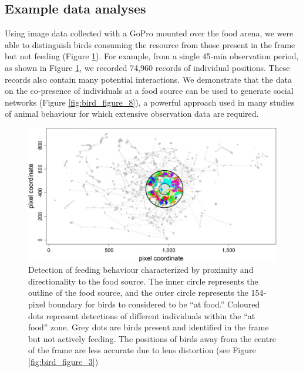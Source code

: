 \documentclass[11pt,a4paper,oneside]{book}
\begin{document}
\begin{doublespace}
\subsection{Example data analyses}
Using image data collected with a GoPro mounted over the food arena, we were able to distinguish birds consuming the resource from those present in the frame but not feeding (Figure \ref{fig:bird_figure_7}). For example, from a single 45‐min observation period, as shown in Figure \ref{fig:bird_figure_7}, we recorded 74,960 records of individual positions. These records also contain many potential interactions. We demonstrate that the data on the co‐presence of individuals at a food source can be used to generate social networks (Figure \ref{fig:bird_figure_8}), a powerful approach used in many studies of animal behaviour for which extensive observation data are required.

\begin{figure}[!htb]
    \centering
    \includegraphics{Graving_IMPRS_Thesis/figures/bird_figure_7.jpg}
    \caption{Detection of feeding behaviour characterized by proximity and directionality to the food source. The inner circle represents the outline of the food source, and the outer circle represents the 154‐pixel boundary for birds to considered to be “at food.” Coloured dots represent detections of different individuals within the “at food” zone. Grey dots are birds present and identified in the frame but not actively feeding. The positions of birds away from the centre of the frame are less accurate due to lens distortion (see Figure \ref{fig:bird_figure_3})
}
    \label{fig:bird_figure_7}
\end{figure}


\end{doublespace}
\end{document}
